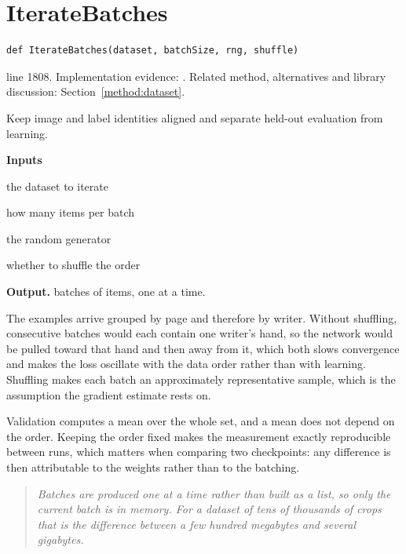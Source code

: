 \section{IterateBatches}\label{fn:train:IterateBatches}
\begin{lstlisting}[style=sig]
def IterateBatches(dataset, batchSize, rng, shuffle)
\end{lstlisting}
 line 1808. Implementation evidence: \cite{code2026}. Related method, alternatives and library discussion: Section~\ref{method:dataset}.


Keep image and label identities aligned and separate held-out evaluation from learning.




\noindent\textbf{Inputs}
\begin{description}[leftmargin=2.2em,style=nextline,font=\normalfont\ttfamily]\setlength\itemsep{1pt}
  \item[{dataset}] \normalfont the dataset to iterate
  \item[{batchSize}] \normalfont how many items per batch
  \item[{rng}] \normalfont the random generator
  \item[{shuffle}] \normalfont whether to shuffle the order
\end{description}

\noindent\textbf{Output.} batches of items, one at a time.


The examples arrive grouped by page and therefore by writer. Without shuffling, consecutive batches would each contain one writer's hand, so the network would be pulled toward that hand and then away from it, which both slows convergence and makes the loss oscillate with the data order rather than with learning. Shuffling makes each batch an approximately representative sample, which is the assumption the gradient estimate rests on.


Validation computes a mean over the whole set, and a mean does not depend on the order. Keeping the order fixed makes the measurement exactly reproducible between runs, which matters when comparing two checkpoints: any difference is then attributable to the weights rather than to the batching.


\begin{quote}\small\itshape Batches are produced one at a time rather than built as a list, so only the current batch is in memory. For a dataset of tens of thousands of crops that is the difference between a few hundred megabytes and several gigabytes.\end{quote}



